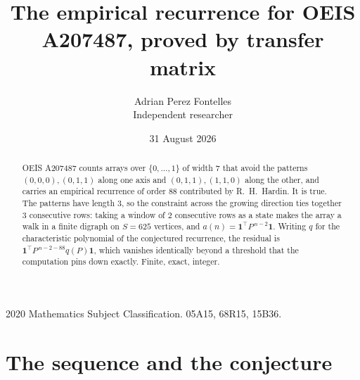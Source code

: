 \documentclass[11pt,a4paper]{article}
\title{The empirical recurrence for OEIS A207487, proved by transfer matrix}
\author{Adrian Perez Fontelles\\ \small Independent researcher}
\date{31 August 2026}
\theoremstyle{plain}
\theoremstyle{definition}
\begin{document}
\maketitle

\begin{abstract}
OEIS A207487 counts arrays over $\{0,\dots,1\}$ of width $7$ that avoid the patterns
$(0,0,0), (0,1,1)$ along one axis and $(0,1,1), (1,1,0)$ along the other, and carries an empirical recurrence of
order $88$ contributed by R.~H.~Hardin. It is true. The patterns have length $3$, so
the constraint across the growing direction ties together $3$ consecutive rows: taking a
window of $2$ consecutive rows as a state makes the array a walk in a finite digraph
on $S=625$ vertices, and $a(n)=\mathbf{1}^{\!\top}P^{\,n-2}\mathbf{1}$. Writing $q$
for the characteristic polynomial of the conjectured recurrence, the residual is
$\mathbf{1}^{\!\top}P^{\,n-2-88}q(P)\mathbf{1}$, which vanishes identically
beyond a threshold that the computation pins down exactly. Finite, exact, integer.
\end{abstract}

\noindent\small 2020 Mathematics Subject Classification. 05A15, 68R15, 15B36.\normalsize

\section{The sequence and the conjecture}
\end{document}
